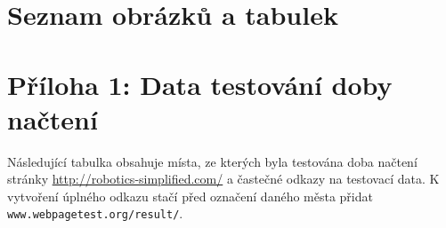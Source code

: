 \documentclass[a4paper, 12pt]{article}
\makeatletter
\renewcommand\listoffigures{%
    \@mkboth{\MakeUppercase\listfigurename}%
        {\MakeUppercase\listfigurename}%
    \@starttoc{lof}%
}
\renewcommand\listoftables{%
    \@mkboth{\MakeUppercase\listtablename}%
        {\MakeUppercase\listtablename}%
    \@starttoc{lot}%
}
\makeatother
\begin{document}
  \newpage

  \glsaddall
  \renewcommand{\glossarypreamble}{\vspace*{-2\baselineskip}}

  \printglossary[type=\acronymtype,title=Seznam zkratek]

  \newpage

  \renewcommand{\refname}{Použitá literatura}
  
  

  \newpage

  \section{Seznam obrázků a tabulek}
  {%
  \let\oldnumberline\numberline%
  \renewcommand{\numberline}{\figurename~\oldnumberline}%
  \listoffigures%
  }
  \vspace{\baselineskip}
  {%
  \let\oldnumberline\numberline%
  \renewcommand{\numberline}{\tablename~\oldnumberline}%
  \listoftables%
  }

  \newpage

  \section{Příloha 1: Data testování doby načtení} \label{sec:Příloha 1: Data testování doby načtení}
  Následující tabulka obsahuje místa, ze kterých byla testována doba načtení stránky \url{http://robotics-simplified.com/} a častečné odkazy na testovací data. K vytvoření úplného odkazu stačí před označení daného města přidat \texttt{www.webpagetest.org/result/}.
\end{document}
